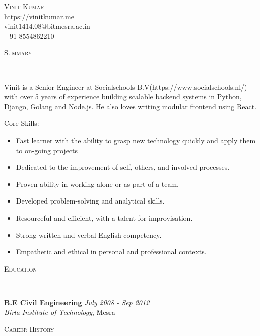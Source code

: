 \documentclass[9pt]{article}
\newenvironment{changemargin}[2]{%
  \begin{list}{}{%
    \setlength{\topsep}{0pt}%
    \setlength{\leftmargin}{#1}%
    \setlength{\rightmargin}{#2}%
    \setlength{\listparindent}{\parindent}%
    \setlength{\itemindent}{\parindent}%
    \setlength{\parsep}{\parskip}%
  }%
  \item[]}{\end{list}
}
\newcommand{\lineover}{
    \begin{changemargin}{-0.05in}{-0.05in}
        \vspace*{-8pt}
        \hrulefill \\
        \vspace*{-2pt}
    \end{changemargin}
}
\newcommand{\header}[1]{
    \begin{changemargin}{-0.5in}{-0.5in}
        \scshape{#1}\\
    \lineover
    \end{changemargin}
}
\newcommand{\contact}[4]{
    \begin{changemargin}{-0.5in}{-0.5in}
        \begin{center}
            {\Large \scshape {#1}}\\ \smallskip
            {#2}\\ \smallskip
            {#3}\\ \smallskip
            {#4}\smallskip
        \end{center}
    \end{changemargin}
}
\newenvironment{body} {
    \vspace*{-16pt}
    \begin{changemargin}{-0.25in}{-0.5in}
  }
    {\end{changemargin}
}
\begin{document}
\contact{Vinit Kumar}{https://vinitkumar.me}{vinit1414.08@bitmesra.ac.in}{+91-8554862210}


\header{Summary}

\begin{body}
    \vspace{14pt}
Vinit is a Senior Engineer at Socialschools B.V(https://www.socialschools.nl/) with over 5 years of experience building scalable backend systems in Python, Django, Golang and Node.js. He also loves writing modular frontend using React.


Core Skills:
\begin{itemize} \itemsep -0pt
    \item Fast learner with the ability to grasp new technology quickly and apply them to on-going projects 
    \item Dedicated to the improvement of self, others, and involved processes.
    \item Proven ability in working alone or as part of a team.
    \item Developed problem-solving and analytical skills.
    \item Resourceful and efficient, with a talent for improvisation.
    \item Strong written and verbal English competency.
    \item Empathetic and ethical in personal and professional contexts.
\end{itemize}

\end{body}

\smallskip


\header{Education}

\begin{body}
    \vspace{14pt}
    \textbf{B.E Civil Engineering }{} \hfill \emph{July 2008 - Sep 2012}{} \\
    \emph{Birla Institute of Technology}, Mesra{} \\
\end{body}

\smallskip


\header{Career History}
\end{document}
